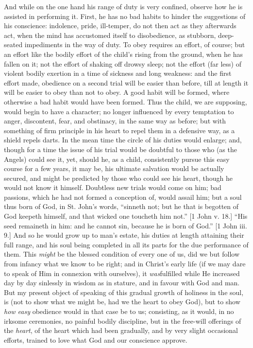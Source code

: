And while on the one hand his range of duty is very
confined, observe how he is assisted in performing it.
First, he has no bad habits to hinder the suggestions of
his conscience: indolence, pride, ill-temper, do not then
act as they afterwards act, when the mind has accustomed
itself to disobedience, as stubborn, deep-seated
impediments in the way of duty. To obey requires an
effort, of course; but an effort like the bodily effort
of the child's rising from the ground, when he has fallen on it; not the effort of shaking off drowsy sleep; not
the effort (far less) of violent bodily exertion in a
time of sickness and long weakness: and the first effort
made, obedience on a second trial will be easier than
before, till at length it will be easier to obey than not
to obey. A good habit will be formed, where otherwise a
bad habit would have been formed. Thus the child, we are
supposing, would begin to have a character; no longer
influenced by every temptation to anger, discontent,
fear, and obstinacy, in the same way as before; but with
something of firm principle in his heart to repel them in
a defensive way, as a shield repels darts. In the mean
time the circle of his duties would enlarge; and, though
for a time the issue of his trial would be doubtful to
those who (as the Angels) could see it, yet, should he,
as a child, consistently pursue this easy course for a
few years, it may be, his ultimate salvation would be
actually secured, and might be predicted by those who
could see his heart, though he would not know it himself.
Doubtless new trials would come on him; bad passions,
which he had not formed a conception of, would assail
him; but a soul thus born of God, in St. John's words,
``sinneth not; but he that is begotten of God keepeth
himself, and that wicked one toucheth him not.'' [1
John v. 18.] ``His seed remaineth in him: and he
cannot sin, because he is born of God.'' [1 John iii.
9.] And so he would grow up to man's estate, his duties
at length attaining their full range, and his soul being
completed in all its parts for the due performance of
them. This \emph{might} be the blessed condition of every
one of us, did we but follow from infancy what we know to
be right; and in Christ's early life (if we may dare to
speak of Him in connexion with ourselves), it \emph{was}fulfilled
while He increased day by day sinlessly in wisdom as in
stature, and in favour with God and man. But my present
object of speaking of this gradual growth of holiness in
the soul, is (not to show what we might be, had we the
heart to obey God), but to show \emph{how easy} obedience
would in that case be to us; consisting, as it would, in
no irksome ceremonies, no painful bodily discipline, but
in the free-will offerings of the \emph{heart}, of the
heart which had been gradually, and by very slight
occasional efforts, trained to love what God and our
conscience approve.

